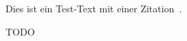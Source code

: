 

\chapter{\introductionlabel}\label{cha:introduction}

Dies ist ein Test-Text mit einer Zitation~\cite{mustermann2023}.

TODO

